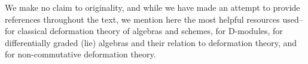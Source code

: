 We make no claim to originality, and while we have made an attempt to provide
references throughout the text, we mention here the most helpful resources
used-- \cite{szendroi_unbearable_1999, hartshorne_deformation_2010,
belmans_hochschild_2018} for classical deformation
theory of algebras and schemes, \cite{bellamy2016noncommutative, hotta2007d,
ginzburg1998lectures, okitaniIntroductionDmodules2022} for D-modules,
\cite{august_differentially_2015} for differentially graded (lie) algebras and
their relation to deformation theory, and \cite{eriksen_noncommutative_2017,
eriksenComputingNoncommutativeDeformations2014, segal__2008} for non-commutative
deformation theory.
